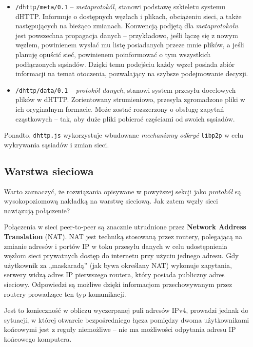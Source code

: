 \begin{itemize}
    \item \texttt{/dhttp/meta/0.1} -- {\em metaprotokół}, stanowi podstawę szkieletu systemu dHTTP. Informuje o dostępnych węzłach i plikach, obciążeniu sieci, a także następujących na bieżąco zmianach. Konwencją podjętą dla {\em metaprotokołu} jest powszechna propagacja danych -- przykładowo, jeśli łączę się z nowym węzłem, powinienem wysłać mu listę posiadanych przeze mnie plików, a jeśli planuję opuścić sieć, powinienem poinformować o tym wszystkich podłączonych sąsiadów. Dzięki temu podejściu każdy węzeł posiada zbiór informacji na temat otoczenia, pozwalający na szybsze podejmowanie decyzji.

    \item \texttt{/dhttp/data/0.1} -- {\em protokół danych}, stanowi system przesyłu docelowych plików w dHTTP. Zorientowany strumieniowo, przesyła zgromadzone pliki w ich oryginalnym formacie. Może zostać rozszerzony o obsługę zapytań cząstkowych -- tak, aby duże pliki pobierać częściami od swoich sąsiadów.
\end{itemize}
Ponadto, \texttt{dhttp.js} wykorzystuje wbudowane {\em mechanizmy odkryć} \texttt{libp2p} w celu wykrywania sąsiadów i zmian sieci.



\subsection{Warstwa sieciowa}
Warto zaznaczyć, że rozwiązania opisywane w powyższej sekcji jako {\em protokół} są wysokopoziomową nakładką na warstwę sieciową. Jak zatem węzły sieci nawiązują połączenie?

Połączenia w sieci peer-to-peer są znacznie utrudnione przez \textbf{ Network Address Translation} (NAT). NAT jest techniką stosowaną przez routery, polegającą na zmianie adresów i portów IP w toku przesyłu danych w celu udostępnienia węzłom sieci prywatnych dostęp do internetu przy użyciu jednego adresu. Gdy użytkownik za „maskaradą” (jak bywa określany NAT) wykonuje zapytania, serwery widzą adres IP pierwszego routera, który posiada publiczny adres sieciowy. Odpowiedzi są możliwe dzięki informacjom przechowywanym przez routery prowadzące ten typ komunikacji.

Jest to konieczność w obliczu wyczerpanej puli adresów IPv4, prowadzi jednak do sytuacji, w której otwarcie bezpośredniego łącza pomiędzy dwoma użytkownikami końcowymi jest z reguły niemożliwe -- nie ma możliwości odpytania adresu IP końcowego komputera.


